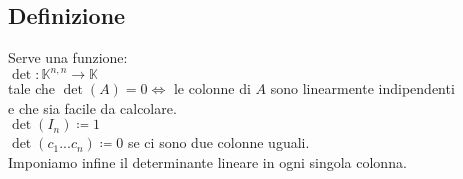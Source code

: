 \documentclass[a4paper, twoside, italian, 11pt]{book}
\newcommand{\K}{\mathbb K}
\begin{document}
\subsection{Definizione}

Serve una funzione: \\

$\det : \K^{n,n} \rightarrow \K$ \\

\noindent
tale che $\det(A) = 0 \iff$ le colonne di $A$ sono linearmente indipendenti \\

\noindent
e che sia facile da calcolare. \\

$\det(I_n) \coloneqq 1$ \\

$\det(c_1 ... c_n) \coloneqq 0$ se ci sono due colonne uguali. \\ %

Imponiamo infine il determinante lineare in ogni singola colonna. %
\end{document}
